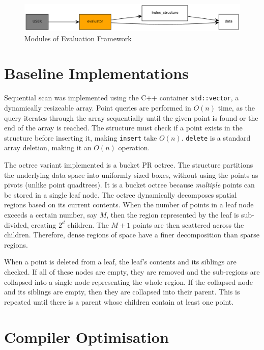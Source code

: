 \begin{figure}
	\centering
	\includegraphics[scale=0.6]{figures/evaluation_framework.pdf}
	\caption{Modules of Evaluation Framework}
	\label{fig:evaluation-framework}
\end{figure}

\section{Baseline Implementations}
 
Sequential scan was implemented using the C++ container \texttt{std::vector}, a dynamically resizeable array.  Point queries are performed in $O(n)$ time, as the query iterates through the array sequentially until the given point is found or the end of the array is reached. The structure must check if a point exists in the structure before inserting it, making \texttt{insert} take $O(n)$. \texttt{delete} is a standard array deletion, making it an $O(n)$ operation.

The octree variant implemented is a bucket PR octree. The structure partitions the underlying data space into uniformly sized boxes, without using the points as pivots (unlike point quadtrees). It is a bucket octree because \textit{multiple} points can be stored in a single leaf node. The octree dynamically decomposes spatial regions based on its current contents. When the number of points in a leaf node exceeds a certain number, say $M$, then the region represented by the leaf is sub-divided, creating $2^d$ children. The $M + 1$ points are then scattered across the children. Therefore, dense regions of space have a finer decomposition than sparse regions.

When a point is deleted from a leaf, the leaf's contents and its siblings are checked. If all of these nodes are empty, they are removed and the sub-regions are collapsed into a single node representing the whole region. If the collapsed node and its siblings are empty, then they are collapsed into their parent. This is repeated until there is a parent whose children contain at least one point.

\section{Compiler Optimisation}

